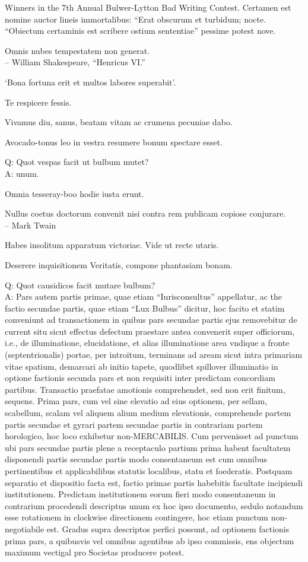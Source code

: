 \documentclass[titlepage,12pt]{memoir}
\begin{document}
Winners in the 7th Annual Bulwer-Lytton Bad Writing Contest. Certamen est
nomine auctor lineis immortalibus: “Erat obscurum et turbidum;
nocte. “Obiectum certaminis est scribere ostium sententiae”
pessime potest nove.

Omnis nubes tempestatem non generat.
\\-- William Shakespeare, “Henricus VI.”

‘Bona fortuna erit et multos labores superabit’.

Te respicere fessis.

Vivamus diu, sanus, beatam vitam ac crumena pecuniae dabo.

Avocado-tonus leo in vestra resumere bonum spectare esset.

Q: Quot vespas facit ut bulbum mutet?\\
A: unum.

Omnia tesseray-boo hodie iusta erunt.

Nullus coetus doctorum convenit nisi contra rem publicam copiose conjurare.
\\-- Mark Twain

Habes insolitum apparatum victoriae. Vide ut recte utaris.

Deserere inquisitionem Veritatis, compone phantasiam bonam.

Q: Quot causidicos facit mutare bulbum?\\
A: Pars autem partis primae, quae etiam “Iurisconsultus” appellatur, ac the
factio secundae partis, quae etiam “Lux Bulbus” dicitur, hoc facito et statim
conveniunt ad transactionem in quibus pars secundae partis ejus removebitur
de current situ sicut effectus defectum praestare antea convenerit
super officiorum, i.e., de illuminatione, elucidatione, et alias illuminatione
area vndique a fronte (septentrionalis) portae, per introitum, terminans
ad aream sicut intra primariam vitae spatium, demarcari ab initio
tapete, quodlibet spillover illuminatio in optione factionis
secunda pars et non requisiti inter predictam concordiam
partibus.
Transactio praefatae amotionis comprehendet, sed non erit
finitum, sequens. Prima pars, cum vel sine
elevatio ad eius optionem, per sellam, scabellum, scalam vel aliquem alium
medium elevationis, comprehende partem partis secundae et gyrari partem
secundae partis in contrariam partem horologico, hoc loco exhibetur
non-MERCABILIS. Cum pervenisset ad punctum ubi pars secundae partis
plene a receptaculo partium prima
habent facultatem disponendi partis secundae partis modo
consentaneum est cum omnibus pertinentibus et applicabilibus statutis localibus, statu et foederatis.
Postquam separatio et dispositio facta est, factio primae partis
habebitis facultate incipiendi institutionem. Predictam institutionem eorum
fieri modo consentaneum in contrarium procedendi descriptus
unum ex hoc ipso documento, sedulo notandum esse rotationem
in clockwise directionem contingere, hoc etiam punctum non- negotiabile est.
Gradus supra descriptos perfici possunt, ad optionem factionis
prima pars, a quibusvis vel omnibus agentibus ab ipso commissis, ens objectum
maximum vectigal pro Societas producere potest.
\end{document}
